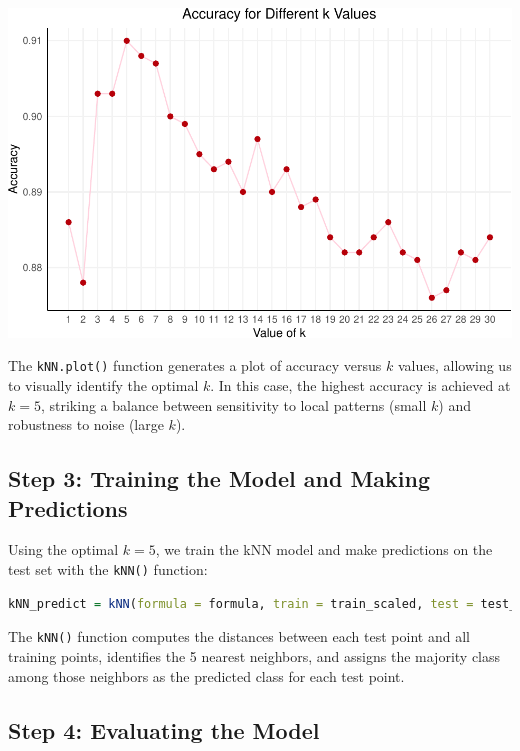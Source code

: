 \documentclass[
]{book}
\newcommand{\passthrough}[1]{#1}
\theoremstyle{definition}
\theoremstyle{definition}
\theoremstyle{definition}
\theoremstyle{definition}
\theoremstyle{remark}
\begin{document}
\begin{center}\includegraphics{knn_files/figure-latex/unnamed-chunk-8-1} \end{center}

The \passthrough{\lstinline!kNN.plot()!} function generates a plot of accuracy versus \(k\) values, allowing us to visually identify the optimal \(k\). In this case, the highest accuracy is achieved at \(k = 5\), striking a balance between sensitivity to local patterns (small \(k\)) and robustness to noise (large \(k\)).

\subsection{Step 3: Training the Model and Making Predictions}\label{step-3-training-the-model-and-making-predictions}

Using the optimal \(k = 5\), we train the kNN model and make predictions on the test set with the \passthrough{\lstinline!kNN()!} function:

\begin{lstlisting}[language=R]
kNN_predict = kNN(formula = formula, train = train_scaled, test = test_scaled, k = 5)
\end{lstlisting}

The \passthrough{\lstinline!kNN()!} function computes the distances between each test point and all training points, identifies the 5 nearest neighbors, and assigns the majority class among those neighbors as the predicted class for each test point.

\subsection{Step 4: Evaluating the Model}\label{step-4-evaluating-the-model}
\end{document}
